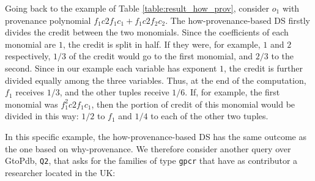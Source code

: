 %


Going back to the example of Table \ref{table:result_how_prov}, consider $o_1$ with provenance polynomial $f_1 c2f_1 c_1 + f_1 c2f_2 c_2$. The how-provenance-based DS firstly divides the credit between the two monomials. Since the coefficients of each monomial are $1$, the credit is split in half. If they were, for example, $1$ and $2$ respectively, $1/3$ of the credit would go to the first monomial, and $2/3$ to the second.  
Since in our example each variable has exponent $1$, the credit is further divided equally among the three variables. Thus, at the end of the computation, $f_1$ receives $1/3$, and the other tuples receive $1/6$.
If, for example, the first monomial was $f_1^2 c2f_1 c_1$, then the portion of credit of this monomial would be divided in this way: $1/2$ to $f_1$ and $1/4$ to each of the other two tuples. 


In this specific example, the how-provenance-based DS has the same outcome as the one based on why-provenance. %
We therefore consider another query over GtoPdb, \texttt{Q2}, that asks for the families of type \texttt{gpcr} that have as contributor a researcher located in the UK:

